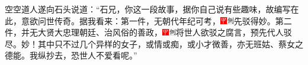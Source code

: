 空空道人遂向石头说道：``石兄，你这一段故事，据你自己说有些趣味，故编写在此，意欲问世传奇。据我看来：第一件，无朝代年纪可考，{\includegraphics[width=3mm]{../Images/00002}\includegraphics[width=3mm]{../Images/00011}\footnotesize \kaishu 先驳得妙。}第二件，并无大贤大忠理朝廷、治风俗的善政，{\includegraphics[width=3mm]{../Images/00002}\includegraphics[width=3mm]{../Images/00011}\footnotesize \kaishu 将世人欲驳之腐言，预先代人驳尽。妙！}其中只不过几个异样的女子，或情或痴，或小才微善，亦无班姑、蔡女之德能。我纵抄去，恐世人不爱看呢。''

